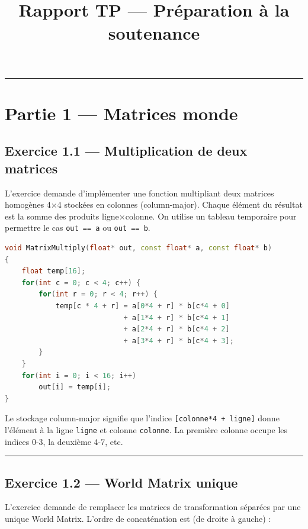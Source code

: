 \documentclass[11pt,a4paper]{article}
\title{\textbf{Rapport TP — Préparation à la soutenance}}
\author{}
\date{}
\begin{document}
\maketitle

\hrule
\vspace{1em}

\section{Partie 1 — Matrices monde}

\subsection{Exercice 1.1 — Multiplication de deux matrices}

L'exercice demande d'implémenter une fonction multipliant deux matrices homogènes 4×4 stockées en colonnes (column-major). Chaque élément du résultat est la somme des produits ligne×colonne. On utilise un tableau temporaire pour permettre le cas \texttt{out == a} ou \texttt{out == b}.

\begin{lstlisting}[language=C++]
void MatrixMultiply(float* out, const float* a, const float* b)
{
    float temp[16];
    for(int c = 0; c < 4; c++) {
        for(int r = 0; r < 4; r++) {
            temp[c * 4 + r] = a[0*4 + r] * b[c*4 + 0]
                            + a[1*4 + r] * b[c*4 + 1]
                            + a[2*4 + r] * b[c*4 + 2]
                            + a[3*4 + r] * b[c*4 + 3];
        }
    }
    for(int i = 0; i < 16; i++)
        out[i] = temp[i];
}
\end{lstlisting}

Le stockage column-major signifie que l'indice \texttt{[colonne*4 + ligne]} donne l'élément à la ligne \texttt{ligne} et colonne \texttt{colonne}. La première colonne occupe les indices 0-3, la deuxième 4-7, etc.

\vspace{1em}\hrule\vspace{1em}

\subsection{Exercice 1.2 — World Matrix unique}

L'exercice demande de remplacer les matrices de transformation séparées par une unique World Matrix. L'ordre de concaténation est (de droite à gauche) :
\end{document}
